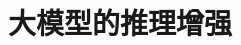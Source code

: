\setcounter{chapter}{22}

\hypertarget{ux5927ux6a21ux578bux7684ux63a8ux7406ux589eux5f3a}{%
\chapter{大模型的推理增强}\label{ux5927ux6a21ux578bux7684ux63a8ux7406ux589eux5f3a}}
